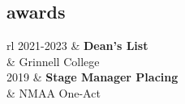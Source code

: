 \documentclass[12pt]{article}
\newcommand{\tableentry}[3]{\textsc{#1} & #2\expandafter\ifstrequal\expandafter{#3}{}{\\}{\\[6pt]}}
\begin{document}
\begin{paracol}{2}
\bigskip

\section{awards}
\begin{supertabular}{rl}
  \tableentry{2021-2023}{\textbf{Dean's List}}{}
  \tableentry{}{Grinnell College}{spaceafter}
  \tableentry{2019}{\textbf{Stage Manager Placing}}{}
  \tableentry{}{NMAA One-Act}{spaceafter}
\end{supertabular}

\end{paracol}

\vspace*{\fill}
\end{document}
